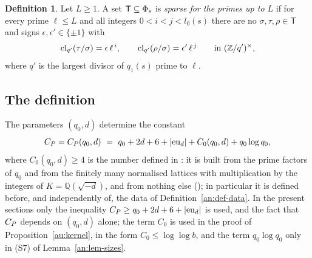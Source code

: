 \documentclass[10pt]{amsart}
\theoremstyle{definition}
\newtheorem{definition}[theorem]{Definition}
\theoremstyle{remark}
\begin{document}
\begin{definition}\label{an:def-sparse}
Let $L\ge1$. A set $\mathsf T\subseteq\Phi_s$ is \emph{sparse for the primes
up to $L$} if for every prime $\ell\le L$ and all integers $0<i<j<l_0(s)$
there are no $\sigma,\tau,\rho\in\mathsf T$ and signs
$\epsilon,\epsilon'\in\{\pm1\}$ with
\[
 \mathrm{cl}_{q'}(\tau/\sigma)=\epsilon\,\ell^{\,i},\qquad \mathrm{cl}_{q'}(\rho/\sigma)=\epsilon'\,\ell^{\,j}\qquad\text{in }(\mathbb Z/q')^{\times},
\]
where $q'$ is the largest divisor of $q_1(s)$ prime to $\ell$.
\end{definition}

\subsection{The definition}\label{an:ssec-data}
The parameters $(q_0,d)$ determine the constant
\begin{equation}\label{an:eq-CP}
 C_P=C_P(q_0,d)\ =\ q_0+2d+6+|\mathrm{eu}_d|+C_0(q_0,d)+q_0\log q_0 ,
\end{equation}
where $C_0(q_0,d)\ge4$ is the number defined in {\cite[(76)]{P49}}: it is built from the prime
factors of $q_0$ and from the finitely many normalised lattices with multiplication by the integers
of $K=\mathbb Q(\sqrt{-d})$, and from nothing else ({\cite[Lemma~8.7(a)]{P49}}); in particular it is
defined before, and independently of, the data of Definition~\ref{an:def-data}. In the present
sections only the inequality $C_P\ge q_0+2d+6+|\mathrm{eu}_d|$ is used, and the fact that $C_P$ depends
on $(q_0,d)$ alone; the term $C_0$ is used in the proof of Proposition~\ref{au:kernel}, in the form
$C_0\le\log\log b$, and the term $q_0\log q_0$ only in (S7) of Lemma~\ref{an:lem-sizes}.
\end{document}
